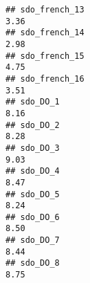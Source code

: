 \documentclass[
]{article}
\begin{document}
\begin{verbatim}
## sdo_french_13                                                                                                                                                                                                                 3.36
## sdo_french_14                                                                                                                                                                                                                 2.98
## sdo_french_15                                                                                                                                                                                                                 4.75
## sdo_french_16                                                                                                                                                                                                                 3.51
## sdo_DO_1                                                                                                                                                                                                                      8.16
## sdo_DO_2                                                                                                                                                                                                                      8.28
## sdo_DO_3                                                                                                                                                                                                                      9.03
## sdo_DO_4                                                                                                                                                                                                                      8.47
## sdo_DO_5                                                                                                                                                                                                                      8.24
## sdo_DO_6                                                                                                                                                                                                                      8.50
## sdo_DO_7                                                                                                                                                                                                                      8.44
## sdo_DO_8                                                                                                                                                                                                                      8.75

\end{verbatim}
\end{document}
